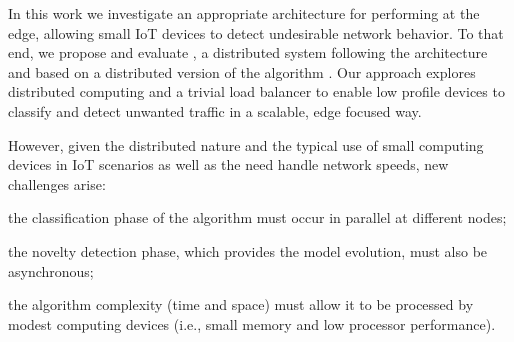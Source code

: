 % 
% 

In this work we investigate an appropriate architecture for performing \nd at
the edge, allowing small IoT devices to detect undesirable network behavior.
To that end, we propose and evaluate \mfog, a distributed \nd system following
the \arch architecture \cite{Cassales2019a} and based on a distributed version
of the algorithm \minas \cite{Faria2016minas}.
Our approach explores distributed computing and a trivial load balancer to
enable low profile devices to classify and detect unwanted traffic in a
scalable, edge focused way.


However, given the distributed nature and the typical use of small computing
devices in IoT scenarios as well as the need handle network speeds, new challenges arise:
\begin{enumerate*}[label=(\emph{\roman*})]
  \item the classification phase of the algorithm must occur in parallel at
  different nodes;
  \item the novelty detection phase, which provides the model evolution, must
  also be asynchronous;
  \item the algorithm complexity (time and space) must allow it to be processed
  by modest computing devices (i.e., small memory and low processor performance).
\end{enumerate*}

